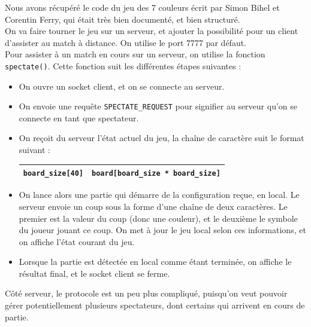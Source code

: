 \documentclass[a4paper]{article}
\begin{document}
Nous avons récupéré le code du jeu des 7 couleurs écrit par Simon Bihel et Corentin Ferry, qui était très bien documenté, et bien structuré. \\

On va faire tourner le jeu sur un serveur, et ajouter la possibilité pour un client d'assister au match à distance.
On utilise le port 7777 par défaut. \\


Pour assister à un match en cours sur un serveur, on utilise la fonction \texttt{spectate()}. Cette fonction suit les différentes étapes suivantes :

%
\begin{itemize}
	\setlength\itemsep{0.5em}
	\item On ouvre un socket client, et on se connecte au serveur.
	\item On envoie une requête \texttt{SPECTATE\_REQUEST} pour signifier au serveur qu'on se connecte en tant que spectateur.
	\item On reçoit du serveur l'état actuel du jeu, la chaîne de caractère suit le format suivant :

		\bgroup
		\def\arraystretch{1.2}
		\begin{center}
		\begin{tabular}{|c|c|}
			\hline 
			\texttt{board\_size[40]} & \texttt{board[board\_size * board\_size]} \\ 
			\hline 
		\end{tabular} 	
		\end{center}
		\egroup
	
	\item On lance alors une partie qui démarre de la configuration reçue, en local. Le serveur envoie un coup sous la forme d'une chaîne de deux caractères. Le premier est la valeur du coup (donc une couleur), et le deuxième le symbole du joueur jouant ce coup. On met à jour le jeu local selon ces informations, et on affiche l'état courant du jeu. 
	\item Lorsque la partie est détectée en local comme étant terminée, on 
	affiche le résultat final, et le socket client se ferme. \\

\end{itemize}
%


\noindent Côté serveur, le protocole est un peu plus compliqué, puisqu'on veut pouvoir 
gérer potentiellement plusieurs spectateurs, dont certains qui arrivent en 
cours de partie. \\
\end{document}
